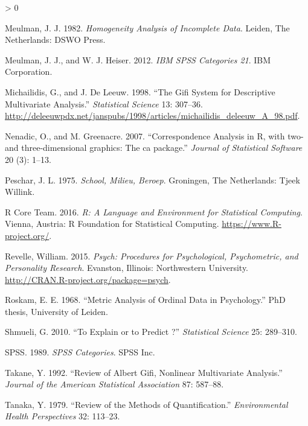 \documentclass[
  12pt,
]{book}
\newlength{\cslhangindent}
\newenvironment{CSLReferences}[2] %
 {%
  \setlength{\parindent}{0pt}
  \ifodd #1 \everypar{\setlength{\hangindent}{\cslhangindent}}\ignorespaces\fi
  \ifnum #2 > 0
  \setlength{\parskip}{#2\baselineskip}
  \fi
 }%
 {}
\begin{document}
\begin{CSLReferences}{1}{0}
\leavevmode\hypertarget{ref-meulman_82}{}%
Meulman, J. J. 1982. \emph{{Homogeneity Analysis of Incomplete Data}}. Leiden, The Netherlands: {DSWO} Press.

\leavevmode\hypertarget{ref-meulman_heiser_12}{}%
Meulman, J. J., and W. J. Heiser. 2012. \emph{IBM SPSS Categories 21}. IBM Corporation.

\leavevmode\hypertarget{ref-michailidis_deleeuw_A_98}{}%
Michailidis, G., and J. De Leeuw. 1998. {``The Gifi System for Descriptive Multivariate Analysis.''} \emph{Statistical Science} 13: 307--36. \url{http://deleeuwpdx.net/janspubs/1998/articles/michailidis_deleeuw_A_98.pdf}.

\leavevmode\hypertarget{ref-nenadic_greenacre_07}{}%
Nenadic, O., and M. Greenacre. 2007. {``{Correspondence Analysis in R, with two- and three-dimensional graphics: The ca package}.''} \emph{Journal of Statistical Software} 20 (3): 1--13.

\leavevmode\hypertarget{ref-peschar_75}{}%
Peschar, J. L. 1975. \emph{{School, Milieu, Beroep}}. Groningen, The Netherlands: Tjeek Willink.

\leavevmode\hypertarget{ref-r_core_team_16}{}%
R Core Team. 2016. \emph{R: A Language and Environment for Statistical Computing}. {Vienna, Austria}: R Foundation for Statistical Computing. \url{https://www.R-project.org/}.

\leavevmode\hypertarget{ref-revelle_15}{}%
Revelle, William. 2015. \emph{Psych: Procedures for Psychological, Psychometric, and Personality Research}. Evanston, Illinois: Northwestern University. \url{http://CRAN.R-project.org/package=psych}.

\leavevmode\hypertarget{ref-roskam_68}{}%
Roskam, E. E. 1968. {``{Metric Analysis of Ordinal Data in Psychology}.''} PhD thesis, University of Leiden.

\leavevmode\hypertarget{ref-shmueli_10}{}%
Shmueli, G. 2010. {``{To Explain or to Predict ?}''} \emph{Statistical Science} 25: 289--310.

\leavevmode\hypertarget{ref-spss_89}{}%
SPSS. 1989. \emph{SPSS Categories}. SPSS Inc.

\leavevmode\hypertarget{ref-takane_92}{}%
Takane, Y. 1992. {``{Review of Albert Gifi, Nonlinear Multivariate Analysis}.''} \emph{Journal of the American Statistical Association} 87: 587--88.

\leavevmode\hypertarget{ref-tanaka_79}{}%
Tanaka, Y. 1979. {``{Review of the Methods of Quantification}.''} \emph{Environmental Health Perspectives} 32: 113--23.


\end{CSLReferences}
\end{document}
